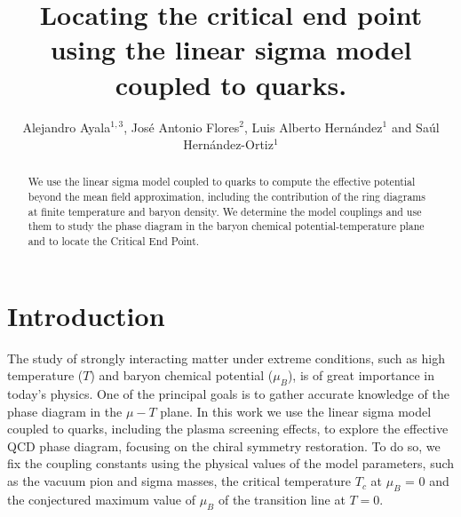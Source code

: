 \documentclass[%
 reprint,
showpacs,preprintnumbers,
 amsmath,amssymb,
onecolumn]{revtex4}
\begin{document}
%
\title{Locating the critical end point using the linear sigma model coupled to quarks.}
%
%

\author{Alejandro Ayala$^{1,3}$, Jos\'e Antonio Flores$^2$, Luis Alberto Hern\'andez$^1$ and Sa\'ul Hern\'andez-Ortiz$^1$}


\begin{abstract}%
We use the linear sigma model coupled to quarks to compute the effective potential beyond the mean field approximation, including the contribution of the ring diagrams at finite temperature and baryon density. We determine the model couplings and use them to study the phase diagram in the baryon chemical potential-temperature plane and to locate the Critical End Point.
\end{abstract}

%
\maketitle
%
\section{Introduction}
The study of strongly interacting matter under extreme conditions, such as high temperature ($T$) and baryon chemical potential ($\mu_B$), is of great importance in today's physics. One of the principal goals is to gather accurate knowledge of the phase diagram in the $\mu-T$ plane. In this work we use the linear sigma model coupled to quarks, including the plasma screening effects, to explore the effective QCD phase diagram, focusing on the chiral symmetry restoration.  To do so, we fix the coupling constants using the physical values of the model parameters, such as the vacuum pion and sigma masses, the critical temperature $T_c$ at $\mu_B$ = 0 and the conjectured maximum value of $\mu_B$ of the transition line at $T = 0$.
\label{intro}
\end{document}
